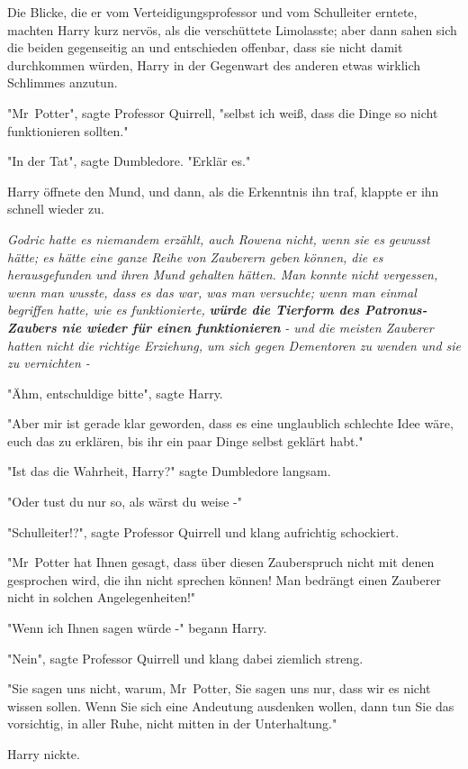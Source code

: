 {Die Blicke, die er vom Verteidigungsprofessor und vom Schulleiter erntete, machten Harry kurz nervös, als die verschüttete Limolasste; aber dann sahen sich die beiden gegenseitig an und entschieden offenbar, dass sie nicht damit durchkommen würden, Harry in der Gegenwart des anderen etwas wirklich Schlimmes anzutun.

"Mr~Potter", sagte Professor Quirrell, "selbst ich weiß, dass die Dinge so nicht funktionieren sollten."

"In der Tat", sagte Dumbledore. "Erklär es."

Harry öffnete den Mund, und dann, als die Erkenntnis ihn traf, klappte er ihn schnell wieder zu.

\emph{Godric hatte es niemandem erzählt, auch Rowena nicht, wenn sie es gewusst hätte; es hätte eine ganze Reihe von Zauberern geben können, die es herausgefunden und ihren Mund gehalten hätten. Man konnte nicht vergessen, wenn man wusste, dass es das war, was man versuchte; wenn man einmal begriffen hatte, wie es funktionierte,} \textbf{\emph{würde die Tierform des Patronus-Zaubers nie wieder für einen funktionieren}} \emph{- und die meisten Zauberer hatten nicht die richtige Erziehung, um sich gegen Dementoren zu wenden und sie zu vernichten -}

"Ähm, entschuldige bitte", sagte Harry.

"Aber mir ist gerade klar geworden, dass es eine unglaublich schlechte Idee wäre, euch das zu erklären, bis ihr ein paar Dinge selbst geklärt habt."

"Ist das die Wahrheit, Harry?" sagte Dumbledore langsam.

"Oder tust du nur so, als wärst du weise -"

"Schulleiter!?", sagte Professor Quirrell und klang aufrichtig schockiert.

"Mr~Potter hat Ihnen gesagt, dass über diesen Zauberspruch nicht mit denen gesprochen wird, die ihn nicht sprechen können! Man bedrängt einen Zauberer nicht in solchen Angelegenheiten!"

"Wenn ich Ihnen sagen würde -" begann Harry.

"Nein", sagte Professor Quirrell und klang dabei ziemlich streng.

"Sie sagen uns nicht, warum, Mr~Potter, Sie sagen uns nur, dass wir es nicht wissen sollen. Wenn Sie sich eine Andeutung ausdenken wollen, dann tun Sie das vorsichtig, in aller Ruhe, nicht mitten in der Unterhaltung."

Harry nickte.

}

